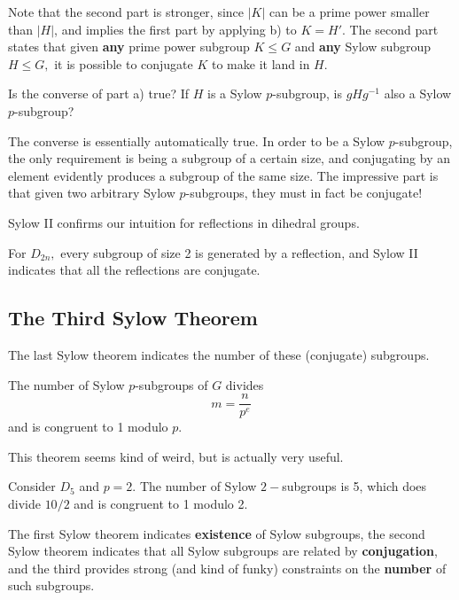 Note that the second part is stronger, since $|K|$ can be a prime power smaller than $|H|$, and implies the first part by applying b) to $K = H'.$ The second part states that given \textbf{any} prime power subgroup $K \leq G$ and \textbf{any} Sylow subgroup $H \leq G,$ it is possible to conjugate $K$ to make it land in $H.$

\begin{question}
Is the converse of part a) true? If $H$ is a Sylow $p$-subgroup, is $gHg^{-1}$ also a Sylow $p$-subgroup?
\end{question}
\begin{ans}
The converse is essentially automatically true. In order to be a Sylow $p$-subgroup, the only requirement is being a subgroup of a certain size, and conjugating by an element evidently produces a subgroup of the same size. The impressive part is that given two arbitrary Sylow $p$-subgroups, they must in fact be conjugate!
\end{ans}

Sylow II confirms our intuition for reflections in dihedral groups.
\begin{example}
For $D_{2n},$ every subgroup of size 2 is generated by a reflection, and Sylow II indicates that all the reflections are conjugate.
\end{example}

\subsection{The Third Sylow Theorem}

The last Sylow theorem indicates the number of these (conjugate) subgroups.

\begin{theorem}
The number of Sylow $p$-subgroups of $G$ divides \[m = \frac{n}{p^e}\] and is congruent to 1 modulo $p.$
\end{theorem}

This theorem seems kind of weird, but is actually very useful.

\begin{example}
Consider $D_5$ and $p = 2.$ The number of Sylow $2-$subgroups is 5, which does divide $10/2$ and is congruent to 1 modulo 2.
\end{example}

The first Sylow theorem indicates \textbf{existence} of Sylow subgroups, the second Sylow theorem indicates that all Sylow subgroups are related by \textbf{conjugation}, and the third provides strong (and kind of funky) constraints on the \textbf{number} of such subgroups.



